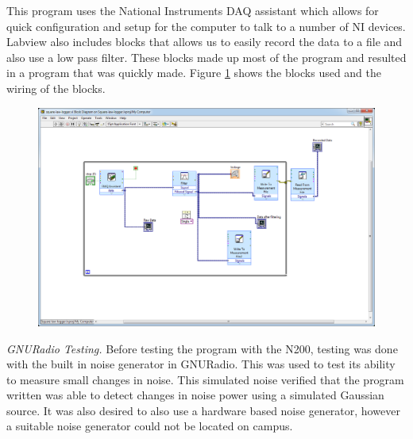 This program uses the National Instruments DAQ assistant which allows for quick configuration and setup for the computer to talk to a number of NI devices.  Labview also includes blocks that allows us to easily record the data to a file and also use a low pass filter.  These blocks made up most of the program and resulted in a program that was quickly made.  Figure \ref{labviewblock} shows the blocks used and the wiring of the blocks.

{\begin{figure}[h!tb] \centering
\includegraphics[width=\textwidth]{Images/labview-diagram.png}
\label{labviewblock}
\end{figure}
}

\emph{GNURadio Testing.  }Before testing the program with the N200, testing was done with the built in noise generator in GNURadio.  This was used to test its ability to measure small changes in noise.  This simulated noise verified that the program written was able to detect changes in noise power using a simulated Gaussian source.  It was also desired to also use a hardware based noise generator, however a suitable noise generator could not be located on campus.

